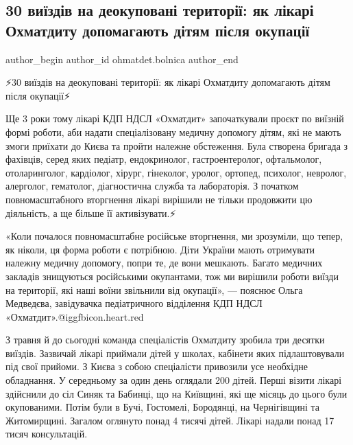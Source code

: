  
 
 
 
 
 
\subsection{30 виїздів на деокуповані території: як лікарі Охматдиту допомагають дітям після окупації}
\label{sec:13_12_2022.fb.ohmatdet.bolnica.1.vyizdy}
 
\ifcmt
 author_begin
   author_id ohmatdet.bolnica
 author_end
\fi

⚡️30 виїздів на деокуповані території: як лікарі Охматдиту допомагають дітям після окупації⚡️

Ще 3 роки тому лікарі КДП НДСЛ «Охматдит» започаткували проєкт по виїзній формі
роботи, аби надати спеціалізовану медичну допомогу дітям, які не мають змоги
приїхати до Києва та пройти належне обстеження. Була створена бригада з
фахівців, серед яких педіатр, ендокринолог, гастроентеролог, офтальмолог,
отоларинголог, кардіолог, хірург, гінеколог, уролог, ортопед, психолог,
невролог, алерголог, гематолог, діагностична служба та лабораторія. З початком
повномасштабного вторгнення лікарі вирішили не тільки продовжити цю діяльність,
а ще більше її активізувати.⚡️

«Коли почалося повномасштабне російське вторгнення, ми зрозуміли, що тепер, як
ніколи, ця форма роботи є потрібною. Діти України мають отримувати належну
медичну допомогу, попри те, де вони мешкають. Багато медичних закладів
знищуються російськими окупантами, тож ми вирішили роботи виїзди на території,
які наші воїни звільнили від окупації», — пояснює Ольга Медведєва, завідувачка
педіатричного відділення КДП НДСЛ «Охматдит».@igg{fbicon.heart.red}

З травня й до сьогодні команда спеціалістів Охматдиту зробила три десятки
виїздів. Зазвичай лікарі приймали дітей у школах, кабінети яких підлаштовували
під свої прийоми. З Києва з собою спеціалісти привозили усе необхідне
обладнання. У середньому за один день оглядали 200 дітей. Перші візити лікарі
здійснили до сіл Синяк та Бабинці, що на Київщині, які ще місяць до цього були
окупованими. Потім були в Бучі, Гостомелі, Бородянці, на Чернігівщині та
Житомирщині. Загалом оглянуто понад 4 тисячі дітей. Лікарі надали понад 17
тисяч консультацій.🙌🏻

